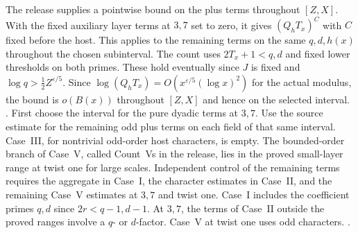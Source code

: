 The release supplies a pointwise bound on the plus terms throughout
\([Z,X]\). With the fixed auxiliary layer terms at \(3,7\) set to zero,
it gives \((Q_h T_x)^C\) with \(C\) fixed before the host. This applies
to the remaining terms on the same \(q,d,h(x)\) throughout the
chosen subinterval. The count uses \(2T_x+1<q,d\) and fixed lower
thresholds on both primes. These hold eventually since \(J\) is
fixed and \(\log q>\tfrac12 Z^{\varepsilon/5}\). Since
\(\log(Q_h T_x)=O(x^{\varepsilon/5}(\log x)^2)\) for the actual modulus,
the bound is \(o(B(x))\) throughout \([Z,X]\) and hence on the
selected interval.
.
{First choose the interval for the pure dyadic terms at \(3,7\).
Use the source estimate for the remaining odd plus terms on each
field of that same interval.}
Case~III, for nontrivial odd-order host characters, is empty.
The bounded-order branch of Case~V, called Count~Vs in the release,
lies in the proved small-layer range at twist one for large scales.
Independent control of the remaining terms requires the aggregate
in Case~I, the character estimates in Case~II, and the remaining
Case~V estimates at \(3,7\) and twist one. Case~I includes the
coefficient primes \(q,d\) since \(2r<q-1,d-1\). At \(3,7\),
the terms of Case~II outside the proved ranges involve a \(q\)- or
\(d\)-factor. Case~V at twist one uses odd characters.
.

